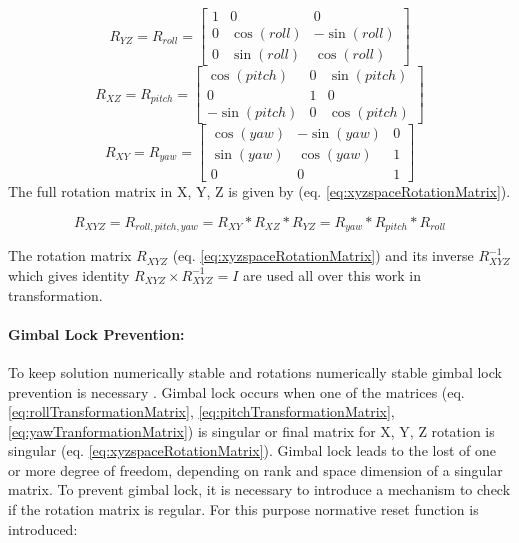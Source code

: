 \begin{equation}\label{eq:rollTransformationMatrix}
    R_{YZ} = R_{roll} =
    \begin{bmatrix}
        1 & 0 & 0\\
        0 & \cos(roll) & -\sin(roll)\\
        0 & \sin(roll) & \cos(roll)
    \end{bmatrix}
\end{equation}
\begin{equation}\label{eq:pitchTransformationMatrix}
    R_{XZ} = R_{pitch} =
    \begin{bmatrix}
        \cos(pitch) & 0 & \sin(pitch)\\
        0 & 1 & 0\\
        -\sin(pitch) & 0 & \cos(pitch)
    \end{bmatrix}
\end{equation}
\begin{equation}\label{eq:yawTranformationMatrix}
    R_{XY} = R_{yaw} = 
    \begin{bmatrix}
        \cos(yaw) & -\sin(yaw) & 0 \\
        \sin(yaw) & \cos(yaw) & 1 \\
        0 & 0 & 1
    \end{bmatrix}
\end{equation}
The full rotation matrix in X, Y, Z  is given by (eq. \ref{eq:xyzspaceRotationMatrix}).

\begin{equation}\label{eq:xyzspaceRotationMatrix}  
        R_{XYZ}  = R_{roll,pitch,yaw} =  R_{XY} * R_{XZ} * R_{YZ} = R_{yaw} * R_{pitch} *R_{roll}
\end{equation}

\begin{note}
    The rotation matrix $R_{XYZ}$ (eq. \ref{eq:xyzspaceRotationMatrix}) and its inverse $R_{XYZ}^{-1}$ which gives identity $R_{XYZ} \times R_{XYZ}^{-1} = I$ are used all over this work in transformation.
\end{note}

\paragraph{Gimbal Lock Prevention:} To keep solution numerically stable and rotations numerically stable gimbal lock prevention is necessary \cite{kramer1977gyro}. Gimbal lock occurs when one of the matrices (eq. \ref{eq:rollTransformationMatrix}, \ref{eq:pitchTransformationMatrix}, \ref{eq:yawTranformationMatrix}) is singular or final matrix for X, Y, Z rotation is singular (eq. \ref{eq:xyzspaceRotationMatrix}). Gimbal lock leads to the lost of one or more degree of freedom, depending on rank and space dimension of a singular matrix. To prevent gimbal lock, it is necessary to introduce a mechanism to check if the rotation matrix is regular. For this purpose normative reset function is introduced:


